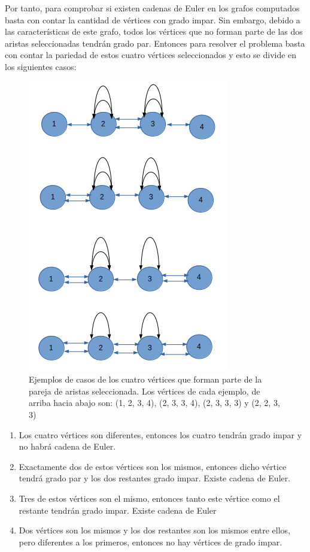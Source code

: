 \documentclass[a4paper,12pt,twocolumn]{article}
\begin{document}
	
	
	
	Por tanto, para comprobar si existen cadenas de Euler en los grafos computados basta con contar la cantidad de vértices con grado impar. Sin embargo, debido a las características de este grafo, todos los vértices que no forman parte de las dos aristas seleccionadas tendrán grado par. Entonces para resolver el problema basta con contar la pariedad de estos cuatro vértices seleccionados y esto se divide en los siguientes casos:
	\begin{figure}
		\centering
		\includegraphics[width=0.8\linewidth]{"Figura 2"}
		\caption{Ejemplos de casos de los cuatro vértices que forman parte de la pareja de aristas seleccionada. Los vértices de cada ejemplo, de arriba hacia abajo son: (1, 2, 3, 4), (2, 3, 3, 4), (2, 3, 3, 3) y (2, 2, 3, 3)}
		\label{fig:figura-2}
	\end{figure}

	\begin{enumerate}
		\item  Los cuatro vértices son diferentes, entonces los cuatro tendrán grado impar y no habrá cadena de Euler.
		\item  Exactamente dos de estos vértices son los mismos, entonces dicho vértice tendrá grado par y los dos restantes grado impar. Existe cadena de Euler.
		\item  Tres de estos vértices son el mismo, entonces tanto este vértice como el restante tendrán grado impar. Existe cadena de Euler
		\item  Dos vértices son los mismos y los dos restantes son los mismos entre ellos, pero diferentes a los primeros, entonces no hay vértices de grado impar.
	\end{enumerate}
 
\end{document}
